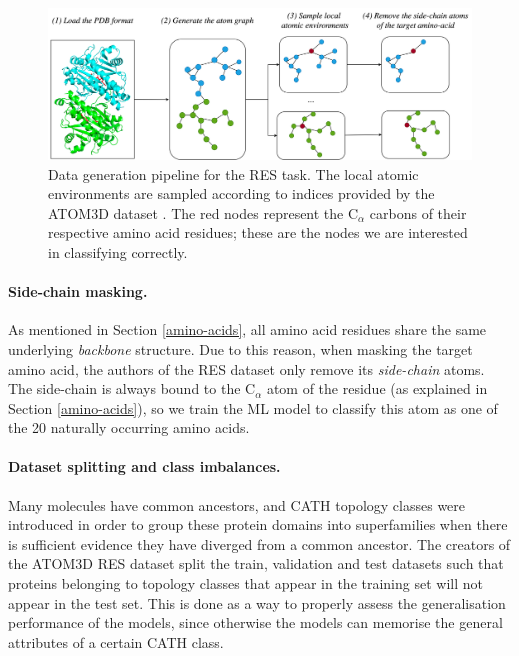 \begin{figure}
    \centering
    \includegraphics[width=\textwidth]{masters-report/figures/graph-pipeline.png}
    \caption{Data generation pipeline for the RES task. The local atomic environments are sampled according to indices provided by the ATOM3D dataset \cite{atom-3d}. The red nodes represent the $\text{C}_{\alpha}$ carbons of their respective amino acid residues; these are the nodes we are interested in classifying correctly.}
    \label{protein_pipeline}
\end{figure}

\paragraph{Side-chain masking.} As mentioned in Section \ref{amino-acids}, all amino acid residues share the same underlying \textit{backbone} structure. Due to this reason, when masking the target amino acid, the authors of the RES dataset only remove its \textit{side-chain} atoms. The side-chain is always bound to the $\text{C}_{\alpha}$ atom of the residue (as explained in Section \ref{amino-acids}), so we train the ML model to classify this atom as one of the 20 naturally occurring amino acids.


\paragraph{Dataset splitting and class imbalances.}
Many molecules have common ancestors, and CATH topology classes \cite{Dawson2017CATH} were introduced in order to group these protein domains into superfamilies when there is sufficient evidence they have diverged from a common ancestor. The creators of the ATOM3D RES dataset split the train, validation and test datasets such that proteins belonging to topology classes that appear in the training set will not appear in the test set. This is done as a way to properly assess the generalisation performance of the models, since otherwise the models can memorise the general attributes of a certain CATH class. 


